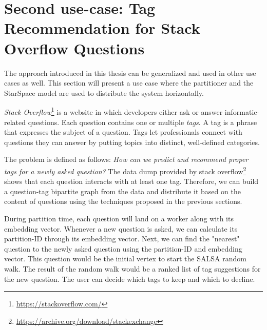 \section{Second use-case: Tag Recommendation for Stack Overflow Questions}
\label{sec:second-usecase}
The approach introduced in this thesis can be generalized and used in other use cases as well. This section will present a use case where the partitioner and the StarSpace model are used to distribute the system horizontally.


\emph{Stack Overflow}\footnote{\url{https://stackoverflow.com/}} is a website in which developers either ask or answer informatic-related questions. Each question contains one or multiple \emph{tags}. A tag is a phrase that expresses the subject of a question. Tags let professionals connect with questions they can answer by putting topics into distinct, well-defined categories.


The problem is defined as follows: \emph{How can we predict and recommend proper tags for a newly asked question?} The data dump provided by stack overflow\footnote{\url{https://archive.org/download/stackexchange}} shows that each question interacts with at least one tag. Therefore, we can build a question-tag bipartite graph from the data and distribute it based on the content of questions using the techniques proposed in the previous sections.


During partition time, each question will land on a worker along with its embedding vector. Whenever a new question is asked, we can calculate its partition-ID through its embedding vector. Next, we can find the "nearest" question to the newly asked question using the partition-ID and embedding vector. This question would be the initial vertex to start the SALSA random walk. The result of the random walk would be a ranked list of tag suggestions for the new question. The user can decide which tags to keep and which to decline.
